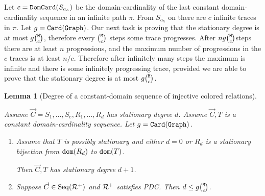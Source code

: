 \documentclass{lmcs}
\newtheorem{lemma}[theorem]{Lemma}
\begin{document}
Let $c = {\tt DomCard}(S_{a_h})$ be the domain-cardinality of the last constant domain-cardinality
sequence in an infinite path $\pi$. From $S_{a_h}$ on there are $c$ infinite traces in $\pi$.
Let $g = {\tt Card}({\tt Graph})$. Our next task is proving that the stationary degree is at most 
$g\newton{\MaxInd}{c}$, therefore every $\newton{\MaxInd}{c}$ steps some trace 
progresses. After $n g \newton{\MaxInd}{c}$steps there are at least $n$ progressions, and the 
maximum number of progressions in the $c$ traces is at least $n/c$.
Therefore after infinitely many steps the maximum is infinite and there is some infinitely 
progressing trace, provided we are able to prove that the stationary degree is at most 
$g \newton{\MaxInd}{c}$.





\begin{lemma}[Degree of a constant-domain sequence of injective colored relations]
\label{lemma-degree-constant}

Assume $\vec{C}= S_1, \ldots, S_e, R_1, \ldots, R_{d}$ has stationary degree $d$.
Assume $\vec{C}, T$ is a constant domain-cardinality sequence. Let $g = {\tt Card}({\tt Graph})$.

\begin{enumerate}
\item
\label{lemma-degree-constant-01}
Assume that $T$ is possibly stationary
and either $d = 0$ or $R_{d}$ is a stationary bijection from ${\tt dom}(R_{d})$ to ${\tt dom}(T)$.

Then $\vec{C}, T$ has stationary degree $d+1$.


\item
\label{lemma-degree-constant-02}
Suppose $\vec{C} \in {\rm Seq}({\mathcal R}^+)$ and ${\mathcal R}^+$ satisfies PDC.
Then $d \le g \newton{\MaxInd}{c}$.
\end{enumerate}
\end{lemma}

\end{document}
